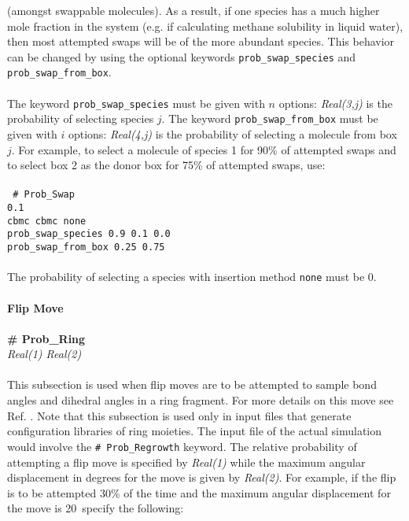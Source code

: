 (amongst swappable molecules).
As a result, if one species has a much higher mole fraction in the system 
(e.g. if calculating methane solubility in liquid water),
then most attempted swaps will be of the more abundant species.
This behavior can be changed by using the optional keywords 
{\tt prob\_swap\_species} and {\tt prob\_swap\_from\_box}. \\ \\
%
The keyword \texttt{prob\_swap\_species} must be given with $n$ options: 
{\it Real(3,j)} is the probability of selecting species $j$.
The keyword {\tt prob\_swap\_from\_box} must be given with $i$ options:
{\it Real(4,j)} is the probability of selecting a molecule from box $j$.
For example, to select a molecule of species 1 for 90\% of attempted swaps and 
to select box 2 as the donor box for 75\% of attempted swaps, use: \\ \\
%
\texttt{ \# Prob\_Swap\\
0.1 \\ 
cbmc cbmc none \\
prob\_swap\_species 0.9 0.1 0.0 \\
prob\_swap\_from\_box 0.25 0.75 \\ \\ }
%
The probability of selecting a species with insertion method \texttt{none} must be 0. \\ \\
%
%
%
{\bf Flip Move}\\ \\
{\bf \# Prob\_Ring} \\
{\it Real(1) Real(2)} \\ \\
%
This subsection is used when flip moves are to be attempted to sample bond angles and 
dihedral angles in a ring fragment. 
For more details on this move see Ref. \cite{Shah:2011}. 
Note that this subsection is used only in input files
that generate configuration libraries of ring moieties. The input file of the 
actual simulation would involve the \texttt{\# Prob\_Regrowth} keyword.
The relative probability of attempting a flip move is 
specified by {\it Real(1)} while the maximum angular displacement 
in degrees for the move is given by {\it Real(2)}. 
For example, if the flip is to be attempted 30\% of the 
time and the maximum angular displacement for the 
move is 20\degree~specify the following: \\ \\
